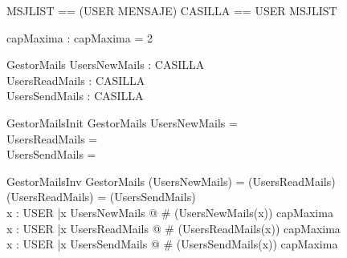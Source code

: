\begin{zed}
\also
MSJLIST == \power (USER \cross MENSAJE)
\also
CASILLA == USER \pfun MSJLIST
\end{zed}

\begin{axdef}
capMaxima : \nat 
\where
capMaxima = 2 
\end{axdef}

\begin{schema}{GestorMails}
UsersNewMails : CASILLA \\
UsersReadMails : CASILLA \\
UsersSendMails : CASILLA 
\end{schema}

\begin{schema}{GestorMailsInit}
GestorMails
\where
UsersNewMails = \emptyset \\
UsersReadMails = \emptyset \\
UsersSendMails = \emptyset
\end{schema}

\begin{schema}{GestorMailsInv}
GestorMails
\where
\dom(UsersNewMails) = \dom(UsersReadMails)\\
\dom(UsersReadMails) = \dom(UsersSendMails) \\
\forall x : USER |x \in \dom UsersNewMails @ \# (UsersNewMails(x)) \leq capMaxima \\
\forall x : USER |x \in \dom UsersReadMails @ \# (UsersReadMails(x)) \leq capMaxima \\
\forall x : USER |x \in \dom UsersSendMails @ \# (UsersSendMails(x)) \leq capMaxima 


\end{schema}

